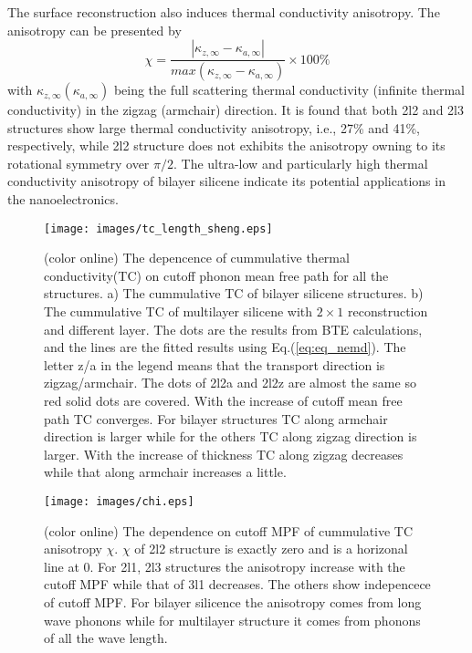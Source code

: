 \documentclass[aps,prb,twocolumn,showpacs,amsmath,amssymb]{revtex4-1}
\begin{document}
The surface reconstruction also induces thermal conductivity anisotropy. The anisotropy can be presented by
\begin{equation}
  \chi=\frac{|\kappa_{z,\infty}-\kappa_{a,\infty} |}{ max⁡(\kappa_{z,\infty}-\kappa_{a,\infty} ) } \times 100 \%  \label{eq:eq_chi}
\end{equation}
with $ \kappa_{z,\infty} (\kappa_{a,\infty})$ being the full scattering thermal conductivity (infinite thermal conductivity) in the zigzag (armchair) direction.
It is found that both 2l2 and 2l3 structures show large thermal conductivity anisotropy, i.e., 27\% and 41\%, respectively, while 2l2 structure does not exhibits the anisotropy owning to its rotational symmetry over $\pi/2$.  The ultra-low and particularly high thermal conductivity anisotropy of bilayer silicene indicate its potential applications in the nanoelectronics.

\begin{figure}[b]
  \texttt{[image: images/tc\_length\_sheng.eps]}
  \caption{\label{fig:tc_length_sheng} (color online) The depencence of cummulative thermal conductivity(TC) on cutoff phonon mean free path for all the structures. a) The cummulative TC of bilayer silicene structures. b) The cummulative TC of multilayer silicene with $2\times 1$ reconstruction and different layer. The dots are the results from BTE calculations, and the lines are the fitted results using Eq.(\ref{eq:eq_nemd}). The letter z/a in the legend means that the transport direction is zigzag/armchair. The dots of 2l2a and 2l2z are almost the same so red solid dots are covered. With the increase of cutoff mean free path TC converges. For bilayer structures TC along armchair direction is larger while for the others TC along zigzag direction is larger. With the increase of thickness TC along zigzag decreases while that along armchair increases a little. }
\end{figure}

\begin{figure}[b]
  \texttt{[image: images/chi.eps]}{}
  \caption{\label{fig:chi} (color online) The dependence on cutoff MPF of cummulative TC anisotropy $\chi$. $\chi$ of 2l2 structure is exactly zero and is a horizonal line at 0. For 2l1, 2l3  structures the anisotropy increase with the cutoff MPF while that of 3l1 decreases. The others show indepencece of cutoff MPF. For bilayer silicence the anisotropy comes from long wave phonons while for multilayer structure it comes from phonons of all the wave length. }
\end{figure}
\end{document}
